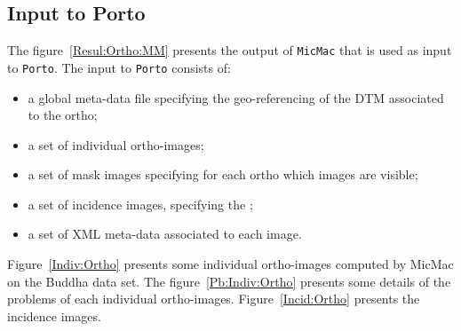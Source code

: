 
\subsection{Input to Porto}

The figure~\ref{Resul:Ortho:MM} presents the output of {\tt MicMac} that is used as
input to {\tt Porto}.
The input to {\tt Porto} consists of:

\begin{itemize}

   \item   a global meta-data  file specifying the geo-referencing of the
           DTM associated to the ortho;

  \item  a set of individual ortho-images;

  \item a set of mask images specifying for each ortho which images are visible;

  \item a set of incidence images, specifying the ;

  \item  a set of XML meta-data  associated to each image.
\end{itemize}


Figure~\ref{Indiv:Ortho} presents some individual ortho-images computed by MicMac on the
Buddha data set. The figure~\ref{Pb:Indiv:Ortho} presents some details of
the problems of each individual ortho-images. Figure~\ref{Incid:Ortho}
presents the incidence images.






